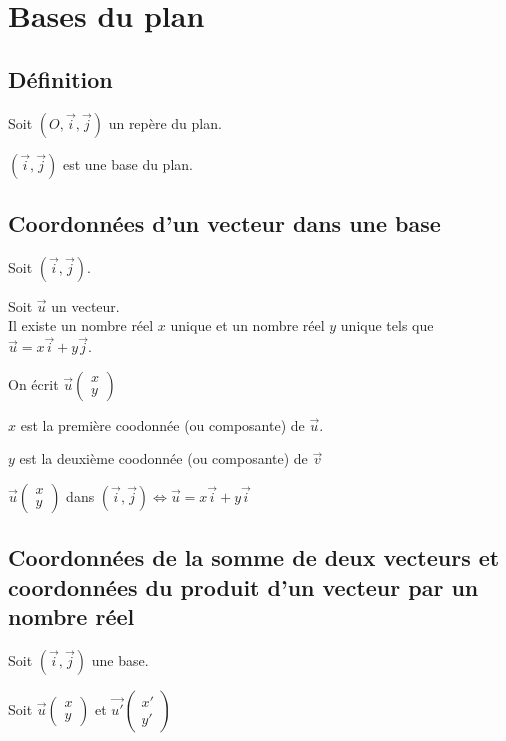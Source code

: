 \section{Bases du plan}

\subsection{Définition}

Soit $\left(O, \vec{i}, \vec{j}\right)$ un repère du plan.

$\left(\vec{i}, \vec{j}\right)$ est une base du plan.

\subsection{Coordonnées d'un vecteur dans une base}

Soit $\left(\vec{i}, \vec{j}\right)$.

Soit $\vec{u}$ un vecteur. \\

Il existe un nombre réel $x$ unique et un nombre réel $y$ unique tels que $\vec{u} = x\vec{i} + y\vec{j}$.

On écrit $\vec{u}\left(\begin{array}{c} x\\ y \end{array}\right)$

$x$ est la première coodonnée (ou composante) de $\vec{u}$.

$ y$ est la deuxième coodonnée (ou composante) de $\vec{v}$

$\vec{u}\left(\begin{array}{c} x\\ y \end{array}\right)$ dans $\left(\vec{i}, \vec{j}\right) \Longleftrightarrow \vec{u} = x\vec{i} + y\vec{i}$

\subsection{Coordonnées de la somme de deux vecteurs et coordonnées du produit d'un vecteur par un nombre réel}

Soit $\left(\vec{i}, \vec{j}\right)$ une base.

Soit $\vec{u}\left(\begin{array}{c} x\\ y \end{array}\right)$ et $\overrightarrow{u'}\left(\begin{array}{c} x'\\ y' \end{array}\right)$

